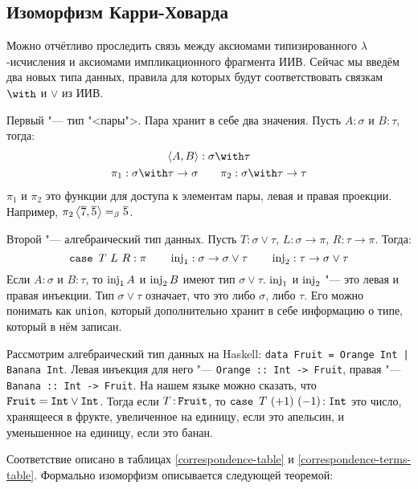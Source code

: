 \subsection{\texorpdfstring{Изоморфизм Карри-Ховарда}{Curry-Howard correspondence}}

Можно отчётливо проследить связь между аксиомами типизированного $\lambda$-исчисления и аксиомами импликационного фрагмента ИИВ.
Сейчас мы введём два новых типа данных, правила для которых будут соответствовать связкам $\with$ и $\lor$ из ИИВ.

Первый "--- тип "<пары">. Пара хранит в себе два значения. Пусть $A : \sigma$ и $B : \tau$, тогда:
\begin{gather*}
    \pair{A,B} : \sigma \with \tau \\
    \pi_1 : \sigma\with\tau\to\sigma \qquad \pi_2 : \sigma\with\tau\to\tau
\end{gather*}
$\pi_1$ и $\pi_2$ это функции для доступа к элементам пары, левая и правая проекции.
Например, $\pi_2 \left<\overline 7,\overline 5\right> =_\beta \overline 5$.

Второй "--- алгебраический тип данных. Пусть $T : \sigma\vee\tau$, $L : \sigma\to\pi$, $R : \tau\to\pi$. Тогда:
\[
    \mathinner{\mathtt{case}}~T~L~R : \pi \qquad \operatorname{inj}_1 : \sigma\to\sigma\vee\tau \qquad \operatorname{inj}_2 : \tau\to\sigma\vee\tau
\]
Если $A : \sigma$ и $B : \tau$, то $\operatorname{inj}_1 A$ и $\operatorname{inj}_2 B$ имеют тип $\sigma\vee\tau$.
$\operatorname{inj}_1$ и $\operatorname{inj}_2$ "--- это левая и правая инъекции.
Тип $\sigma \vee \tau$ означает, что это либо $\sigma$, либо $\tau$.
Его можно понимать как \texttt{union}, который дополнительно хранит в себе информацию о типе, который в нём записан.

Рассмотрим алгебраический тип данных на Haskell: \texttt{data Fruit = Orange Int | Banana Int}. Левая инъекция для него "---
\texttt{Orange :: Int -> Fruit}, правая "--- \texttt{Banana :: Int -> Fruit}.
На нашем языке можно сказать, что $\mathinner\mathtt{Fruit} = \mathinner{\mathtt{Int}} \vee \mathinner{\mathtt{Int}}$.
Тогда если $T \mathinner{:} \mathtt{Fruit}$, то $\mathinner{\mathtt{case}}~T~(+1)~(-1) \mathinner{:} \mathrel{\mathtt{Int}}$ это число,
хранящееся в фрукте, увеличенное на единицу, если это апельсин, и уменьшенное на единицу, если это банан.

Соответствие описано в таблицах \ref{correspondence-table} и \ref{correspondence-terms-table}.
Формально изоморфизм описывается следующей теоремой:

